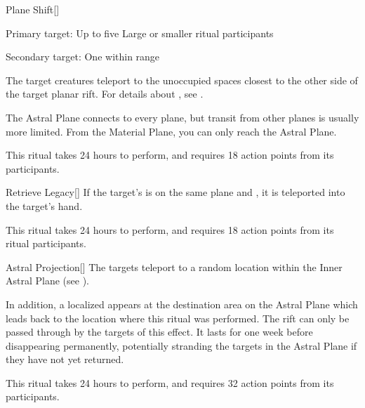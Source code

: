 \lowercase{\hypertarget{spell:Plane Shift}{}}\label{spell:Plane Shift}
\begin{apability}[\nth{3}]{\hypertarget{spell:Plane Shift}{Plane Shift}}[]

Primary target: Up to five Large or smaller ritual participants
\par\noindent
Secondary target: One  within \rngmed range

The target creatures teleport to the unoccupied spaces closest to the other side of the target planar rift.
For details about , see .

The Astral Plane connects to every plane, but transit from other planes is usually more limited.
From the Material Plane, you can only reach the Astral Plane.

This ritual takes 24 hours to perform, and requires 18 action points from its participants.
\end{apability}
\vspace{0.25em}



\lowercase{\hypertarget{spell:Retrieve Legacy}{}}\label{spell:Retrieve Legacy}
\begin{apability}[\nth{3}]{\hypertarget{spell:Retrieve Legacy}{Retrieve Legacy}}[]
If the target's  is on the same plane and , it is teleported into the target's hand.

This ritual takes 24 hours to perform, and requires 18 action points from its ritual participants.
\end{apability}
\vspace{0.25em}



\lowercase{\hypertarget{spell:Astral Projection}{}}\label{spell:Astral Projection}
\begin{apability}[\nth{4}]{\hypertarget{spell:Astral Projection}{Astral Projection}}[]
The targets teleport to a random location within the Inner Astral Plane (see ).

In addition, a localized  appears at the destination area on the Astral Plane which leads back to the location where this ritual was performed.
The rift can only be passed through by the targets of this effect.
It lasts for one week before disappearing permanently, potentially stranding the targets in the Astral Plane if they have not yet returned.

This ritual takes 24 hours to perform, and requires 32 action points from its participants.
\end{apability}
\vspace{0.25em}



